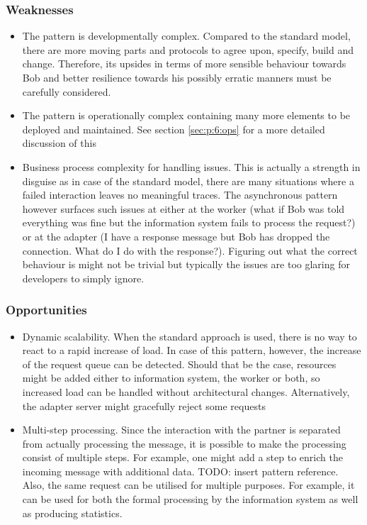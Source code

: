 \documentclass[10pt,a4paper]{article}
\begin{document}
\subsubsection{Weaknesses}
	\begin{itemize}
		\item The pattern is developmentally complex. Compared to the standard model, there are more moving parts and protocols to agree upon, specify, build and change. Therefore, its upsides in terms of more sensible behaviour towards Bob and better resilience towards his possibly erratic manners must be carefully considered.
		\item The pattern is operationally complex containing many more elements to be deployed and maintained. See section \ref{sec:p:6:ops} for a more detailed discussion of this
		\item Business process complexity for handling issues. This is actually a strength in disguise as in case of the standard model, there are many situations where a failed interaction leaves no meaningful traces. The asynchronous pattern however surfaces such issues at either at the worker  (what if Bob was told everything was fine but the information system fails to process the request?) or at the adapter (I have a response message but Bob has dropped the connection. What do I do with the response?). Figuring out what the correct behaviour is might not be trivial but typically the issues are too glaring for developers to simply ignore.
	\end{itemize}

\subsubsection{Opportunities}
	\begin{itemize}
		\item Dynamic scalability. When the standard approach is used, there is no way to react to a rapid increase of load. In case of this pattern, however, the increase of the request queue can be detected. Should that be the case, resources might be added either to information system, the worker or both, so increased load can be handled without architectural changes. Alternatively, the adapter server might gracefully reject some requests
		\item Multi-step processing. Since the interaction with the partner is separated from actually processing the message, it is possible to make the processing consist of multiple steps. For example, one might add a step to enrich the incoming message with additional data. TODO: insert pattern reference. Also, the same request can be utilised for multiple purposes. For example, it can be used for both the formal processing by the information system as well as producing statistics. 
	\end{itemize}
\end{document}
